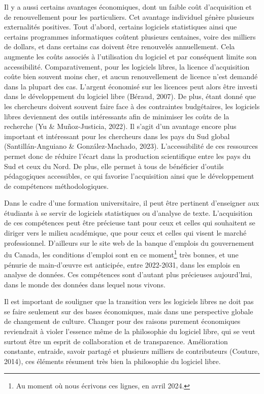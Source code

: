 \documentclass[
  letterpaper,
  DIV=11,
  numbers=noendperiod,
  oneside]{scrreprt}
\begin{document}
Il y a aussi certains avantages économiques, dont un faible coût
d'acquisition et de renouvellement pour les particuliers. Cet avantage
individuel génère plusieurs externalités positives. Tout d'abord,
certains logiciels statistiques ainsi que certains programmes
informatiques coûtent plusieurs centaines, voire des milliers de
dollars, et dans certains cas doivent être renouvelés annuellement. Cela
augmente les coûts associés à l'utilisation du logiciel et par
conséquent limite son accessibilité. Comparativement, pour les logiciels
libres, la licence d'acquisition coûte bien souvent moins cher, et aucun
renouvellement de licence n'est demandé dans la plupart des cas.
L'argent économisé sur les licences peut alors être investi dans le
développement du logiciel libre (Béraud, 2007). De plus, étant donné que
les chercheurs doivent souvent faire face à des contraintes budgétaires,
les logiciels libres deviennent des outils intéressants afin de
minimiser les coûts de la recherche (Yu \& Muñoz-Justicia, 2022). Il
s'agit d'un avantage encore plus important et intéressant pour les
chercheurs dans les pays du Sud global (Santillán-Anguiano \&
González-Machado, 2023). L'accessibilité de ces ressources permet donc
de réduire l'écart dans la production scientifique entre les pays du Sud
et ceux du Nord. De plus, elle permet à tous de bénéficier d'outils
pédagogiques accessibles, ce qui favorise l'acquisition ainsi que le
développement de compétences méthodologiques.

Dans le cadre d'une formation universitaire, il peut être pertinent
d'enseigner aux étudiants à se servir de logiciels statistiques ou
d'analyse de texte. L'acquisition de ces compétences peut être précieuse
tant pour ceux et celles qui souhaitent se diriger vers le milieu
académique, que pour ceux et celles qui visent le marché professionnel.
D'ailleurs sur le site web de la banque d'emplois du gouvernement du
Canada, les conditions d'emploi sont en ce moment\footnote{Au moment où
  nous écrivons ces lignes, en avril 2024.} très bonnes, et une pénurie
de main-d'œuvre est anticipée, entre 2022-2031, dans les emplois en
analyse de données. Ces compétences sont d'autant plus précieuses
aujourd'hui, dans le monde des données dans lequel nous vivons.

Il est important de souligner que la transition vers les logiciels
libres ne doit pas se faire seulement sur des bases économiques, mais
dans une perspective globale de changement de culture. Changer pour des
raisons purement économiques reviendrait à violer l'essence même de la
philosophie du logiciel libre, qui se veut surtout être un esprit de
collaboration et de transparence. Amélioration constante, entraide,
savoir partagé et plusieurs milliers de contributeurs (Couture, 2014),
ces éléments résument très bien la philosophie du logiciel libre.
\end{document}
